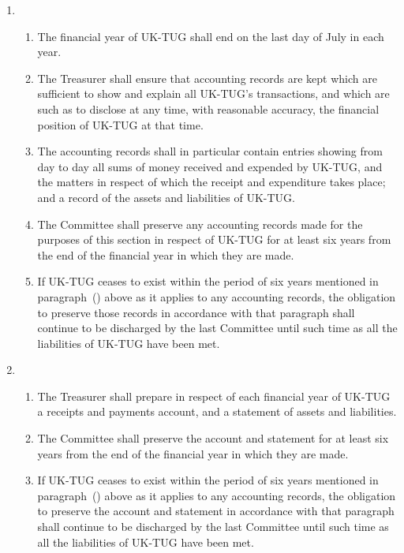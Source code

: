 \documentclass[a4paper,11pt]{article}
\newcounter{refa}
\newcounter{refb}
\begin{document}
\begin{enumerate}

\item
  \begin{enumerate}
  \item The financial year of UK-TUG shall end on the last day of July in each
    year.

  \item The Treasurer shall ensure that accounting records are kept which are
    sufficient to show and explain all UK-TUG's transactions, and which are
    such as to disclose at any time, with reasonable accuracy, the financial
    position of UK-TUG at that time.

  \item The accounting records shall in particular contain entries showing
    from day to day all sums of money received and expended by UK-TUG,
    and the matters in respect of which the receipt and expenditure takes
    place; and a record of the assets and liabilities of UK-TUG.

  \item \setcounter{refa}{\value{enumii}}The Committee shall preserve any
    accounting records made for the purposes of this section in respect of
    UK-TUG for at least six years from the end of the financial year in which
    they are made.

  \item If UK-TUG ceases to exist within the period of six years mentioned in
    paragraph~() above as it applies to any accounting records, the
    obligation to preserve those records in accordance with that paragraph
    shall continue to be discharged by the last Committee until such time as
    all the liabilities of UK-TUG have been met.
  \end{enumerate}

\item
  \begin{enumerate}
  \item The Treasurer shall prepare in respect of each financial year of
    UK-TUG a receipts and payments account, and a statement of assets and
    liabilities.

  \item \setcounter{refb}{\value{enumii}}The Committee shall preserve the
    account and statement for at least six years from the end of the financial
    year in which they are made.

  \item If UK-TUG ceases to exist within the period of six years mentioned in
    paragraph~() above as it applies to any accounting records, the
    obligation to preserve the account and statement in accordance with that
    paragraph shall continue to be discharged by the last Committee until such
    time as all the liabilities of UK-TUG have been met.
  \end{enumerate}


\end{enumerate}
\end{document}
